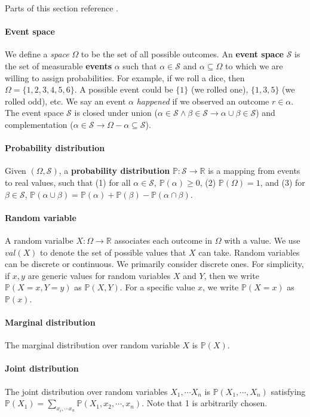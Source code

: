 \documentclass[12pt]{article}
\renewcommand{\P}{\mathbb{P}}
\theoremstyle{definition}
\begin{document}
Parts of this section reference \cite{koller2009probabilistic}.

\paragraph{Event space} We define a \emph{space} $\Omega$ to be the set of all possible outcomes. An \textbf{event space} $\mathcal{S}$ is the set of measurable \textbf{events} $\alpha$ such that $\alpha\in\mathcal{S}$ and $\alpha\subseteq\Omega$ to which we are willing to assign probabilities. For example, if we roll a dice, then $\Omega=\{1,2,3,4,5,6\}$. A possible event could be $\{1\}$ (we rolled one),  $\{1,3,5\}$ (we rolled odd), etc. We say an event $\alpha$ \emph{happened} if we observed an outcome $r\in\alpha$.  The event space $\mathcal{S}$ is closed under union ($\alpha\in\mathcal{S}\land \beta\in\mathcal{S}\rightarrow\alpha\cup\beta\in\mathcal{S}$) and complementation ($\alpha\in\mathcal{S}\rightarrow\Omega-\alpha\subseteq\mathcal{S}$).

\paragraph{Probability distribution} Given $(\Omega,\mathcal{S})$, a \textbf{probability distribution} $\P:\mathcal{S}\rightarrow\mathbb{R}$ is a mapping from events to real values, such that (1) for all $\alpha\in\mathcal{S}$, $\P(\alpha)\geq 0$, (2) $\P(\Omega)=1$, and (3) for $\beta\in\mathcal{S}$, $\P(\alpha\cup\beta)=\P(\alpha)+\P(\beta)-\P(\alpha\cap\beta)$.

\paragraph{Random variable} A random varialbe $X:\Omega\rightarrow\mathbb{R}$ associates each outcome in $\Omega$ with a value. We use $val(X)$ to denote the set of possible values that $X$ can take. Random variables can be discrete or continuous. We primarily consider discrete ones. For simplicity, if $x, y$ are generic values for random variables $X$ and $Y$, then we write $\P(X=x,Y=y)$ as $\P(X,Y)$. For a specific value $x$, we write $\P(X=x)$ as $\P(x)$.

\paragraph{Marginal distribution} The marginal distribution over random variable $X$ is $\P(X)$.

\paragraph{Joint distribution} The joint distribution over random variables $X_1,\cdots X_n$ is $\P(X_1,\cdots,X_n)$ satisfying $\P(X_1)=\sum_{x_i,\cdots x_n}\P(X_1,x_2,\cdots,x_n)$. Note that 1 is arbitrarily chosen.
\end{document}
